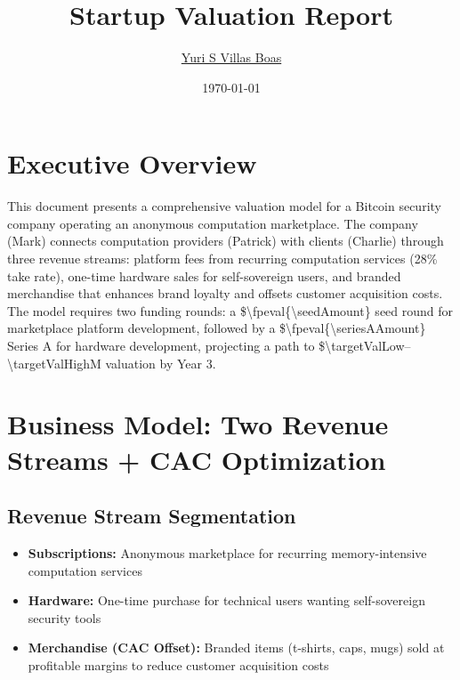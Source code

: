 \documentclass[11pt]{article}
\newcommand{\numint}[1]{\num[round-precision=0]{\fpeval{#1}}}
\begin{document}
\pagestyle{fancy}
\fancyhf{} %
\renewcommand{\headrulewidth}{0pt} %
\renewcommand{\footrulewidth}{0.4pt} %

\title{Startup Valuation Report}
\author{\href{https://linktr.ee/yurisvb}{Yuri S Villas Boas}}
\date{\today}
\maketitle

\section*{Executive Overview}
This document presents a comprehensive valuation model for a Bitcoin security company operating an anonymous computation marketplace. The company (Mark) connects computation providers (Patrick) with clients (Charlie) through three revenue streams: platform fees from recurring computation services (28\% take rate), one-time hardware sales for self-sovereign users, and branded merchandise that enhances brand loyalty and offsets customer acquisition costs. The model requires two funding rounds: a \$\numint{\seedAmount} seed round for marketplace platform development, followed by a \$\numint{\seriesAAmount} Series A for hardware development, projecting a path to \$\num{\targetValLow}--\num{\targetValHigh}M valuation by Year 3.

\section{Business Model: Two Revenue Streams + CAC Optimization}

\subsection{Revenue Stream Segmentation}
\begin{itemize}
  \item \textbf{Subscriptions:} Anonymous marketplace for recurring memory-intensive computation services
  \item \textbf{Hardware:} One-time purchase for technical users wanting self-sovereign security tools
  \item \textbf{Merchandise (CAC Offset):} Branded items (t-shirts, caps, mugs) sold at profitable margins to reduce customer acquisition costs
\end{itemize}
\end{document}
